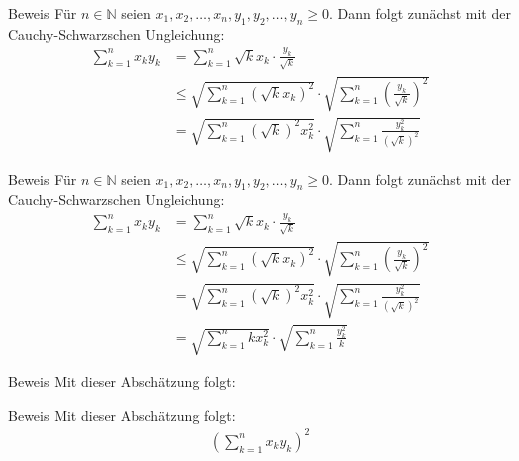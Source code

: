 \documentclass[10pt]{beamer}
\def\bN{\mathbb{N}}
\begin{document}
\begin{frame}{Beweis}
    Für \( n \in \bN \) seien \( x_{1}, x_{2}, \ldots, x_{n}, y_{1}, y_{2}, \ldots, y_{n} \geq 0 \). Dann folgt zunächst mit der Cauchy-Schwarzschen Ungleichung:
    \begin{align*}
        \sum_{k = 1}^{n} x_{k} y_{k}
        & = \sum_{k = 1}^{n} \sqrt{k}x_{k} \cdot \frac{y_{k}}{\sqrt{k}} \\
        & \leq \sqrt{\sum_{k = 1}^{n} \left( \sqrt{k}x_{k} \right)^{2}} \cdot \sqrt{\sum_{k = 1}^{n} \left( \frac{y_{k}}{\sqrt{k}} \right)^{2}} \\
        & = \sqrt{\sum_{k = 1}^{n} \left( \sqrt{k} \right)^{2}x_{k}^{2}} \cdot \sqrt{\sum_{k = 1}^{n} \frac{y_{k}^{2}}{\left( \sqrt{k} \right)^{2}}}
    \end{align*}
\end{frame}



\begin{frame}{Beweis}
    Für \( n \in \bN \) seien \( x_{1}, x_{2}, \ldots, x_{n}, y_{1}, y_{2}, \ldots, y_{n} \geq 0 \). Dann folgt zunächst mit der Cauchy-Schwarzschen Ungleichung:
    \begin{align*}
        \sum_{k = 1}^{n} x_{k} y_{k}
        & = \sum_{k = 1}^{n} \sqrt{k}x_{k} \cdot \frac{y_{k}}{\sqrt{k}} \\
        & \leq \sqrt{\sum_{k = 1}^{n} \left( \sqrt{k}x_{k} \right)^{2}} \cdot \sqrt{\sum_{k = 1}^{n} \left( \frac{y_{k}}{\sqrt{k}} \right)^{2}} \\
        & = \sqrt{\sum_{k = 1}^{n} \left( \sqrt{k} \right)^{2}x_{k}^{2}} \cdot \sqrt{\sum_{k = 1}^{n} \frac{y_{k}^{2}}{\left( \sqrt{k} \right)^{2}}} \\
        & = \sqrt{\sum_{k = 1}^{n} kx_{k}^{2}} \cdot \sqrt{\sum_{k = 1}^{n} \frac{y_{k}^{2}}{k}}
    \end{align*}
\end{frame}



\begin{frame}{Beweis}
    Mit dieser Abschätzung folgt:
\end{frame}



\begin{frame}{Beweis}
    Mit dieser Abschätzung folgt:
    \begin{align*}
        \left( \sum_{k = 1}^{n} x_{k} y_{k} \right)^{2}
    \end{align*}
\end{frame}
\end{document}
